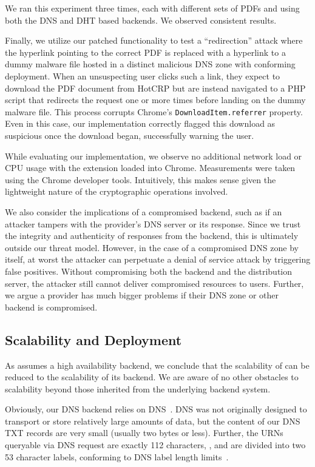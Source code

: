 We ran this experiment three times, each with different sets of PDFs and using
both the DNS and DHT based backends. We observed consistent results.

Finally, we utilize our patched functionality to test a ``redirection'' attack
where the hyperlink pointing to the correct PDF is replaced with a hyperlink to
a dummy malware file hosted in a distinct malicious DNS zone with conforming
\SYSTEM{} deployment. When an unsuspecting user clicks such a link, they expect
to download the PDF document from HotCRP but are instead navigated to a PHP
script that redirects the request one or more times before landing on the dummy
malware file. This process corrupts Chrome's \texttt{DownloadItem.referrer}
property. Even in this case, our implementation correctly flagged this download
as suspicious once the download began, successfully warning the user.

While evaluating our implementation, we observe no additional network load or
CPU usage with the extension loaded into Chrome. Measurements were taken using
the Chrome developer tools. Intuitively, this makes sense given the lightweight
nature of the cryptographic operations involved.

We also consider the implications of a compromised backend, such as if an
attacker tampers with the provider's DNS server or its response. Since we trust
the integrity and authenticity of responses from the backend, this is ultimately
outside our threat model. However, in the case of a compromised DNS zone by
itself, at worst the attacker can perpetuate a denial of service attack by
triggering false positives. Without compromising both the backend and the
distribution server, the attacker still cannot deliver compromised resources to
users. Further, we argue a provider has much bigger problems if their DNS zone
or other backend is compromised.

\subsection{Scalability and Deployment}

As \SYSTEM{} assumes a high availability backend, we conclude that the
scalability of \SYSTEM{} can be reduced to the scalability of its backend. We
are aware of no other obstacles to scalability beyond those inherited from the
underlying backend system.

Obviously, our DNS backend relies on DNS~\cite{DNS1}. DNS was not originally
designed to transport or store relatively large amounts of data, but the content
of our DNS TXT records are very small (usually two bytes or less). Further, the
URNs queryable via DNS request are exactly 112 characters, , and are divided into two 53 character labels, conforming to
DNS label length limits~\cite{DNS2}.

